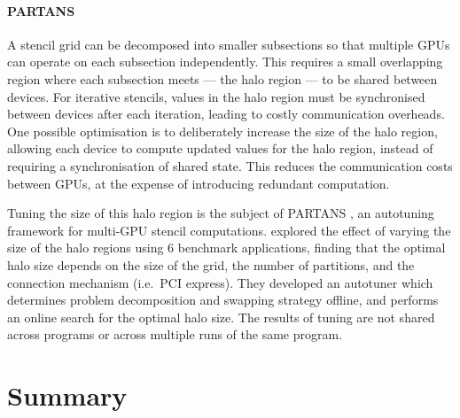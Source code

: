 \paragraph{PARTANS} A stencil grid can be decomposed into smaller
subsections so that multiple GPUs can operate on each subsection
independently. This requires a small overlapping region where each
subsection meets --- the halo region --- to be shared between
devices. For iterative stencils, values in the halo region must be
synchronised between devices after each iteration, leading to costly
communication overheads. One possible optimisation is to deliberately
increase the size of the halo region, allowing each device to compute
updated values for the halo region, instead of requiring a
synchronisation of shared state. This reduces the communication costs
between GPUs, at the expense of introducing redundant computation.

Tuning the size of this halo region is the subject of PARTANS
\cite{Lutz2013}, an autotuning framework for multi-GPU stencil
computations. \citeauthor{Lutz2013} explored the effect of varying the
size of the halo regions using 6 benchmark applications, finding that
the optimal halo size depends on the size of the grid, the number of
partitions, and the connection mechanism (i.e.\ PCI express). They
developed an autotuner which determines problem decomposition and
swapping strategy offline, and performs an online search for the
optimal halo size.  The results of
tuning are not shared across programs or across multiple runs of the
same program.



\section{Summary}
